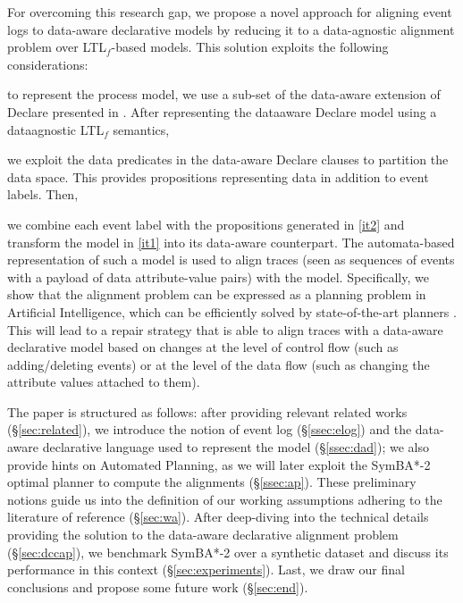 For overcoming this research gap, we propose a novel approach for aligning event logs to data-aware declarative models by reducing it to a data-agnostic alignment problem over LTL$_f$-based models. This solution exploits the following considerations: \begin{enumerate*}[label=\emph{\alph*})]
	\item \label{it1} to represent the process model, we use a sub-set of the data-aware extension of Declare presented in \cite{BurattinMS16}. After representing the data\-aware Declare model using a data\added{-}agnostic LTL$_f$ semantics,
	\item \label{it2} we exploit the data predicates in the data-aware Declare clauses to partition the data space. This provides propositions representing data in addition to event labels. Then,
	\item we combine each event label with the propositions generated in \ref{it2} and transform the model in \ref{it1} into its data-aware counterpart. The automata-based representation of such a model is used to align traces (seen as sequences of events with a payload of data attribute-value pairs) with the model. Specifically, we show that the alignment problem can  be expressed as a planning problem in Artificial Intelligence, which can be efficiently solved by state-of-the-art planners \cite{XuLZ17a,Marrella17}.
%
This will lead to a repair strategy that is able to align traces with a data-aware declarative model based on changes at the level of control flow (such as adding/deleting events) or at the level of the data flow (such as changing the attribute values attached to them).
\end{enumerate*}

The paper is structured as follows: after providing relevant related works (\S\ref{sec:related}), we introduce the notion of event log (\S\ref{ssec:elog}) and the data-aware declarative language used to represent the model (\S\ref{ssec:dad}); we also provide hints on Automated Planning, as we will later exploit the SymBA*-2 optimal planner to compute the alignments (\S\ref{ssec:ap}). These preliminary notions guide us into the definition of our  working assumptions adhering to the literature of reference (\S\ref{sec:wa}). After deep-diving into the technical details providing the solution to the data-aware declarative alignment problem (\S\ref{sec:dccap}), we benchmark SymBA*-2 over a synthetic dataset and discuss its performance in this context (\S\ref{sec:experiments}). Last, we draw our final conclusions and propose some future work (\S\ref{sec:end}).


